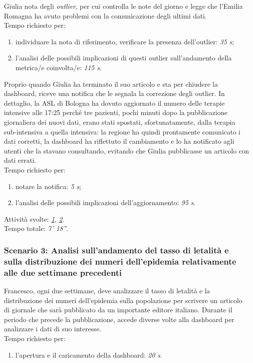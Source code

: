 \noindent
Giulia nota degli \textit{outlier}, per cui controlla le note del giorno e legge che l'Emilia Romagna ha avuto problemi con la comunicazione degli ultimi dati.\\
Tempo richiesto per:
\begin{enumerate}
    \item individuare la nota di riferimento, verificare la presenza dell'outlier: \textit{35 s};
    \item l'analisi delle possibili implicazioni di questi outlier sull'andamento della metrica/e coinvolta/e: \textit{115 s}.
\end{enumerate}

\noindent
Proprio quando Giulia ha terminato il suo articolo e sta per chiudere la dashboard, riceve una notifica che le segnala la correzione degli outlier. In dettaglio, la ASL di Bologna ha dovuto aggiornato il numero delle terapie intensive alle 17:25 perché tre pazienti, pochi minuti dopo la pubblicazione giornaliera dei nuovi dati, erano stati spostati, sfortunatamente, dalla terapia sub-intensiva a quella intensiva: la regione ha quindi prontamente comunicato i dati corretti, la dashboard ha riflettuto il cambiamento e lo ha notificato agli utenti che la stavano consultando, evitando che Giulia pubblicasse un articolo con dati errati.\\
Tempo richiesto per:
\begin{enumerate}
    \item notare la notifica: \textit{5 s};
    \item l'analisi delle possibili implicazioni dell'aggiornamento: \textit{95 s}.
\end{enumerate}

\noindent
Attività svolte: \hyperref[itm:1]{\textit{1}}, \hyperref[itm:2]{\textit{2}}.\\  
Tempo totale: \textit{7' 18''}. 

\subsubsection{Scenario 3: Analisi sull'andamento del tasso di letalità e sulla distribuzione dei numeri dell'epidemia relativamente alle due settimane precedenti}
Francesco, ogni due settimane, deve analizzare il tasso di letalità e la distribuzione dei numeri dell’epidemia sulla popolazione per scrivere un articolo di giornale che sarà pubblicato da un importante editore italiano. Durante il periodo che precede la pubblicazione, accede diverse volte alla dashboard per analizzare i dati di suo interesse.\\
Tempo richiesto per:
\begin{enumerate}
    \item l'apertura e il caricamento della dashboard: \textit{20 s}.
\end{enumerate}

